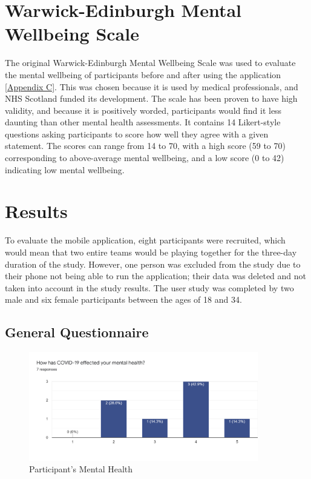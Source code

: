 \documentclass{l4proj}
\begin{document}
\section{Warwick-Edinburgh Mental Wellbeing Scale } 
The original Warwick-Edinburgh Mental Wellbeing Scale was used to evaluate the mental wellbeing of participants before and after using the application \ref{Appendix C}. This was chosen because it is used by medical professionals, and NHS Scotland funded its development. The scale has been proven to have high validity, and because it is positively worded, participants would find it less daunting than other mental health assessments. It contains 14 Likert-style questions asking participants to score how well they agree with a given statement. The scores can range from 14 to 70, with a high score (59 to 70) corresponding to above-average mental wellbeing, and a low score (0 to 42) indicating low mental wellbeing.  

\section{Results} 
To evaluate the mobile application, eight participants were recruited, which would mean that two entire teams would be playing together for the three-day duration of the study. However, one person was excluded from the study due to their phone not being able to run the application; their data was deleted and not taken into account in the study results. The user study was completed by two male and six female participants between the ages of 18 and 34. 

\subsection{General Questionnaire} 
   \begin{figure}[h]
    \centering
     \includegraphics[width=100mm]{dissertation/images/gen.png}
     \caption{Participant's Mental Health}
     \setlength{\belowcaptionskip}{-10pt}
     \label{fig: Forms of exercise}
 \end{figure}
 
\end{document}
